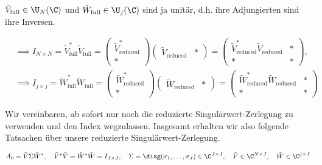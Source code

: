 $\tilde V_\mathrm{full} \in \U_N(\C)$ und $\tilde W_\mathrm{full} \in \U_j(\C)$ sind ja unitär, d.h. ihre Adjungierten sind ihre Inversen.

\begin{align*}
    & \implies
    I_{N \times N}
    =
    \tilde V_\mathrm{full}^\ast \tilde V_\mathrm{full}
    =
    \begin{pmatrix}
        \tilde V_\mathrm{reduced}^\ast \\ \ast
    \end{pmatrix}
    \begin{pmatrix}
        \tilde V_\mathrm{reduced} & \ast
    \end{pmatrix}
    =
    \begin{pmatrix}
        \tilde V_\mathrm{reduced}^\ast \tilde V_\mathrm{reduced} & \ast \\
        \ast                                                     & \ast
    \end{pmatrix}, \\
    & \implies
    I_{j \times j}
    =
    \tilde W_\mathrm{full}^\ast \tilde W_\mathrm{full}
    =
    \begin{pmatrix}
        \tilde W_\mathrm{reduced}^\ast \\ \ast
    \end{pmatrix}
    \begin{pmatrix}
        \tilde W_\mathrm{reduced} & \ast
    \end{pmatrix}
    =
    \begin{pmatrix}
        \tilde W_\mathrm{reduced}^\ast \tilde W_\mathrm{reduced} & \ast \\
        \ast                                                     & \ast
    \end{pmatrix}
\end{align*}

Wir vereinbaren, ab sofort nur noch die reduzierte Singulärwert-Zerlegung zu verwenden und den Index wegzulassen.
Insgesamt erhalten wir also folgende Tatsachen über unsere reduzierte Singulärwert-Zerlegung.

\begin{align} \label{eq:singulärwert_zerlegung}
    A_0 = \tilde V \Sigma \tilde W^\ast,
    \quad
    \tilde V^\ast \tilde V
    =
    \tilde W^\ast \tilde W
    =
    I_{J \times J},
    \quad
    \Sigma = \diag(\sigma_1, \dots, \sigma_J) \in \C^{J \times J},
    \quad
    \tilde V \in \C^{N \times J},
    \quad
    \tilde W \in \C^{j \times J}
\end{align}

